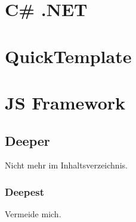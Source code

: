\section{C\# .NET}
\lipsum[5-12]

\section{QuickTemplate}
\lipsum[12-18]

\section{JS Framework}
\lipsum[12-18]

\subsection{Deeper}
Nicht mehr im Inhaltsverzeichnis.

\subsubsection{Deepest}
Vermeide mich.